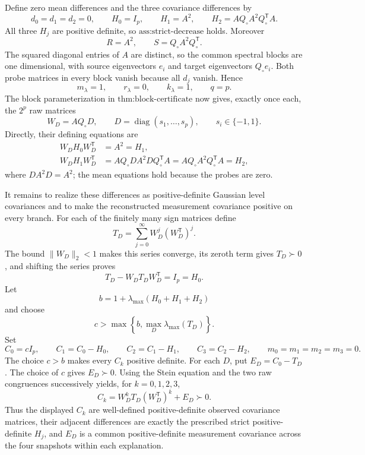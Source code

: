 Define zero mean differences and the three covariance differences by
\[
 d_0=d_1=d_2=0,
 \qquad H_0=I_p,
 \qquad H_1=A^2,
 \qquad H_2=AQ_\circ A^2Q_\circ^{\mathsf T}A.
\]
All three \(H_j\) are positive definite, so \(\text{ass:strict-decrease}\) holds.  Moreover
\[
 R=A^2,
 \qquad S=Q_\circ A^2Q_\circ^{\mathsf T}.
\]
The squared diagonal entries of \(A\) are distinct, so the common spectral blocks are one dimensional, with source eigenvectors \(e_i\) and target eigenvectors \(Q_\circ e_i\).  Both probe matrices in every block vanish because all \(d_j\) vanish.  Hence
\[
 m_\lambda=1,\qquad r_\lambda=0,\qquad k_\lambda=1,\qquad q=p.
\]
The block parameterization in \(\text{thm:block-certificate}\) now gives, exactly once each, the \(2^p\) raw matrices
\[
 W_D=AQ_\circ D,
 \qquad D=\operatorname{diag}(s_1,\ldots,s_p),
 \qquad s_i\in\{-1,1\}.
\]
Directly, their defining equations are
\[
 \begin{aligned}
 W_DH_0W_D^{\mathsf T}&=A^2=H_1,\\
 W_DH_1W_D^{\mathsf T}
 &=AQ_\circ DA^2DQ_\circ^{\mathsf T}A
 =AQ_\circ A^2Q_\circ^{\mathsf T}A=H_2,
 \end{aligned}
\]
where \(DA^2D=A^2\); the mean equations hold because the probes are zero.

It remains to realize these differences as positive-definite Gaussian level covariances and to make the reconstructed measurement covariance positive on every branch.  For each of the finitely many sign matrices define
\[
 T_D=\sum_{j=0}^{\infty}W_D^j(W_D^{\mathsf T})^j.
\]
The bound \(\lVert W_D\rVert_2<1\) makes this series converge, its zeroth term gives \(T_D\succ0\), and shifting the series proves
\[
 T_D-W_DT_DW_D^{\mathsf T}=I_p=H_0.
\]
Let
\[
 b=1+\lambda_{\max}(H_0+H_1+H_2)
\]
and choose
\[
 c>\max\left\{b,\max_D\lambda_{\max}(T_D)\right\}.
\]
Set
\[
 C_0=cI_p,
 \qquad C_1=C_0-H_0,
 \qquad C_2=C_1-H_1,
 \qquad C_3=C_2-H_2,
 \qquad m_0=m_1=m_2=m_3=0.
\]
The choice \(c>b\) makes every \(C_k\) positive definite.  For each \(D\), put \(E_D=C_0-T_D\).  The choice of \(c\) gives \(E_D\succ0\).  Using the Stein equation and the two raw congruences successively yields, for \(k=0,1,2,3\),
\[
 C_k=W_D^kT_D(W_D^{\mathsf T})^k+E_D\succ0.
\]
Thus the displayed \(C_k\) are well-defined positive-definite observed covariance matrices, their adjacent differences are exactly the prescribed strict positive-definite \(H_j\), and \(E_D\) is a common positive-definite measurement covariance across the four snapshots within each explanation.

